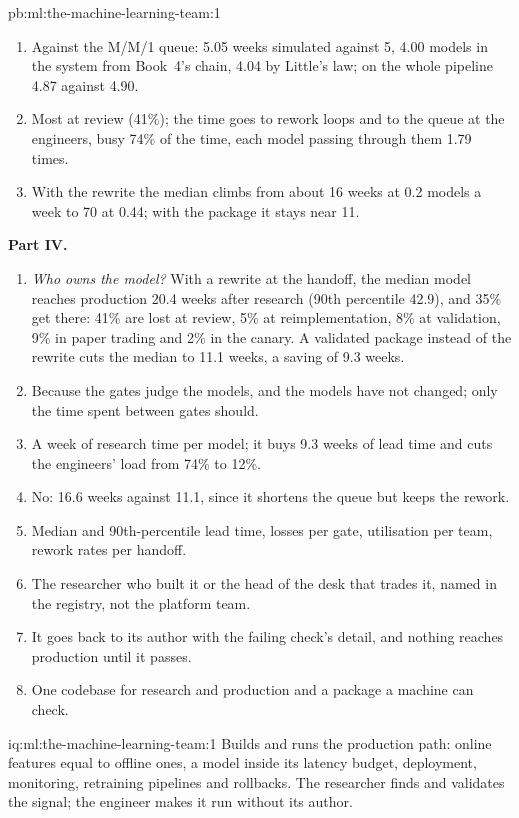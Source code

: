 \begin{solution}{pb:ml:the-machine-learning-team:1}
\begin{enumerate}[resume]
for clarification), validation (kills 10\%, 25\% back to the engineers), four weeks of paper trading (kills 20\%), a two-week
canary (kills 5\%).
\item Against the M/M/1 queue: 5.05 weeks simulated against 5, 4.00 models in the system from Book~4's chain, 4.04 by Little's law;
on the whole pipeline 4.87 against 4.90.
\item Most at review (41\%); the time goes to rework loops and to the queue at the engineers, busy 74\% of the time, each model
passing through them 1.79 times.
\item With the rewrite the median climbs from about 16 weeks at 0.2 models a week to 70 at 0.44; with the package it stays near 11.
\end{enumerate}
\textbf{Part IV.}
\begin{enumerate}[resume]
\item \emph{Who owns the model?} With a rewrite at the handoff, the median model reaches production 20.4 weeks after research
(90th percentile 42.9), and 35\% get there: 41\% are lost at review, 5\% at reimplementation, 8\% at validation, 9\% in paper
trading and 2\% in the canary. A validated package instead of the rewrite cuts the median to 11.1 weeks, a saving of 9.3 weeks.
\item Because the gates judge the models, and the models have not changed; only the time spent between gates should.
\item A week of research time per model; it buys 9.3 weeks of lead time and cuts the engineers' load from 74\% to 12\%.
\item No: 16.6 weeks against 11.1, since it shortens the queue but keeps the rework.
\item Median and 90th-percentile lead time, losses per gate, utilisation per team, rework rates per handoff.
\item The researcher who built it or the head of the desk that trades it, named in the registry, not the platform team.
\item It goes back to its author with the failing check's detail, and nothing reaches production until it passes.
\item One codebase for research and production and a package a machine can check.
\end{enumerate}
\end{solution}

\begin{solution}{iq:ml:the-machine-learning-team:1}
Builds and runs the production path: online features equal to offline ones, a model inside its latency budget, deployment,
monitoring, retraining pipelines and rollbacks. The researcher finds and validates the signal; the engineer makes it run without
its author.
\end{solution}

